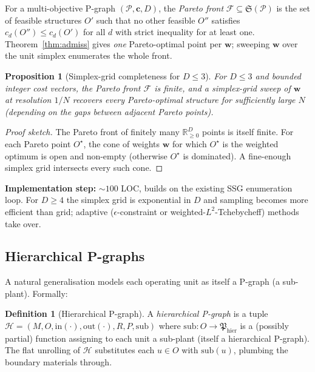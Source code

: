 \documentclass[11pt,a4paper]{article}
\theoremstyle{plain}
\newtheorem{proposition}[theorem]{Proposition}
\theoremstyle{definition}
\newtheorem{definition}[theorem]{Definition}
\newcommand{\Real}{\mathbb{R}}
\newcommand{\Realp}{\Real_{\geq 0}}
\newcommand{\inset}[1]{\mathrm{in}(#1)}
\newcommand{\outset}[1]{\mathrm{out}(#1)}
\newcommand{\bw}{\boldsymbol{w}}
\newcommand{\bc}{\boldsymbol{c}}
\begin{document}
For a multi-objective P-graph $(\mathcal{P}, \bc, D)$, the
\emph{Pareto front} $\mathcal{F} \subseteq \mathfrak{S}(\mathcal{P})$ is the
set of feasible structures $O'$ such that no other feasible
$O''$ satisfies
$c_d(O'') \leq c_d(O')$ for all $d$
with strict inequality for at least one. Theorem~\ref{thm:admiss}
gives \emph{one} Pareto-optimal point per $\bw$; sweeping $\bw$
over the unit simplex enumerates the whole front.

\begin{proposition}[Simplex-grid completeness for $D \leq 3$]
\label{prop:simplex}
For $D \leq 3$ and bounded integer cost vectors, the Pareto front
$\mathcal{F}$ is finite, and a simplex-grid sweep of $\bw$ at
resolution $1/N$ recovers every Pareto-optimal structure for
sufficiently large $N$ (depending on the gaps between adjacent
Pareto points).
\end{proposition}

\begin{proof}[Proof sketch]
The Pareto front of finitely many $\Realp^D$ points is itself
finite. For each Pareto point $O^\star$, the cone of weights
$\bw$ for which $O^\star$ is the weighted optimum is open and
non-empty (otherwise $O^\star$ is dominated). A fine-enough simplex
grid intersects every such cone.
\end{proof}

\textbf{Implementation step:} $\sim 100$ LOC, builds on the existing
SSG enumeration loop. For $D \geq 4$ the simplex grid is
exponential in $D$ and sampling becomes more efficient than grid;
adaptive ($\epsilon$-constraint or weighted-$L^2$-Tchebycheff)
methods take over.

\subsection{Hierarchical P-graphs}

A natural generalisation models each operating unit as itself a
P-graph (a sub-plant). Formally:

\begin{definition}[Hierarchical P-graph]
\label{def:hier}
A \emph{hierarchical P-graph} is a tuple
$\mathcal{H} = (M, O, \inset{\cdot}, \outset{\cdot}, R, P, \mathrm{sub})$
where $\mathrm{sub}: O \to \mathfrak{P}_{\text{hier}}$ is a
(possibly partial) function assigning to each unit a sub-plant
(itself a hierarchical P-graph). The flat unrolling of $\mathcal{H}$
substitutes each $u \in O$ with $\mathrm{sub}(u)$, plumbing the
boundary materials through.
\end{definition}
\end{document}
